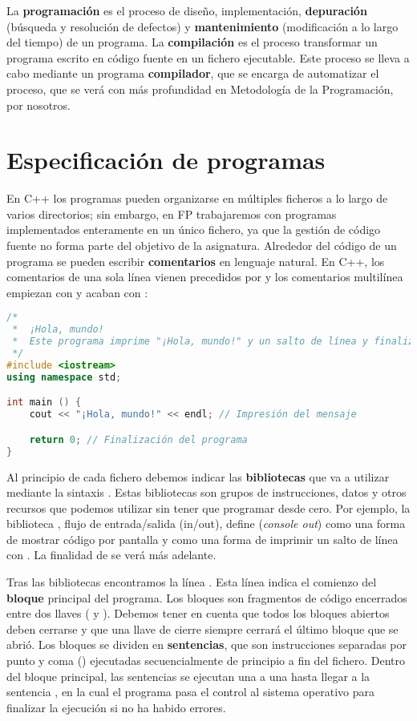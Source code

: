 La \textbf{programación} es el proceso de diseño, implementación, \textbf{depuración} (búsqueda y resolución de defectos) y \textbf{mantenimiento} (modificación a lo largo del tiempo) de un programa.
La \textbf{compilación} es el proceso transformar un programa escrito en código fuente en un fichero ejecutable.
Este proceso se lleva a cabo mediante un programa \textbf{compilador}, que se encarga de automatizar el proceso, que se verá con más profundidad en Metodología de la Programación, por nosotros.

\section{Especificación de programas}

En C++ los programas pueden organizarse en múltiples ficheros a lo largo de varios directorios; sin embargo, en FP trabajaremos con programas implementados enteramente en un único fichero, ya que la gestión de código fuente no forma parte del objetivo de la asignatura.
Alrededor del código de un programa se pueden escribir \textbf{comentarios} en lenguaje natural.
En C++, los comentarios de una sola línea vienen precedidos por \code{//} y los comentarios multilínea empiezan con \code{/*} y acaban con \code{*/}:

\begin{lstlisting}[language=C++]
/*
 *	¡Hola, mundo!
 *	Este programa imprime "¡Hola, mundo!" y un salto de línea y finaliza.
 */
#include <iostream>
using namespace std;

int main () {
	cout << "¡Hola, mundo!" << endl; // Impresión del mensaje

	return 0; // Finalización del programa
}
\end{lstlisting}

Al principio de cada fichero debemos indicar las \textbf{bibliotecas} que va a utilizar mediante la sintaxis .
Estas bibliotecas son grupos de instrucciones, datos y otros recursos que podemos utilizar sin tener que programar desde cero.
Por ejemplo, la biblioteca , flujo de entrada/salida (in/out), define  (\textit{console out}) como una forma de mostrar código por pantalla y  como una forma de imprimir un salto de línea con .
La finalidad de  se verá más adelante.

Tras las bibliotecas encontramos la línea .
Esta línea indica el comienzo del \textbf{bloque} principal del programa.
Los bloques son fragmentos de código encerrados entre dos llaves (\code{\{} y \code{\}}).
Debemos tener en cuenta que todos los bloques abiertos deben cerrarse y que una llave de cierre siempre cerrará el último bloque que se abrió.
Los bloques se dividen en \textbf{sentencias}, que son instrucciones separadas por punto y coma (\code{;}) ejecutadas secuencialmente de principio a fin del fichero.
Dentro del bloque principal, las sentencias se ejecutan una a una hasta llegar a la sentencia , en la cual el programa pasa el control al sistema operativo para finalizar la ejecución si no ha habido errores.

